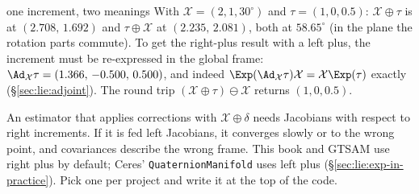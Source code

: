 \begin{example}{one increment, two meanings}
With $\mathcal X=(2,1,30^\circ)$ and $\tau=(1,0,0.5)$: $\mathcal X\oplus\tau$ is at $(2.708,\,1.692)$ and $\tau\oplus\mathcal X$ at $(2.235,\,2.081)$, both at $58.65^\circ$ (in the plane the rotation parts commute). To get the right-plus result with a left plus, the increment must be re-expressed in the global frame: $\Ad_{\mathcal X}\tau=(1.366,\,-0.500,\,0.500)$, and indeed $\Exp(\Ad_{\mathcal X}\tau)\mathcal X=\mathcal X\Exp(\tau)$ exactly (\S\ref{sec:lie:adjoint}). The round trip $(\mathcal X\oplus\tau)\ominus\mathcal X$ returns $(1,0,0.5)$.
\end{example}

\begin{pitfall}
An estimator that applies corrections with $\mathcal X\oplus\delta$ needs Jacobians with respect to right increments. If it is fed left Jacobians, it converges slowly or to the wrong point, and covariances describe the wrong frame. This book and GTSAM use right plus by default; Ceres' \texttt{QuaternionManifold} uses left plus (\S\ref{sec:lie:exp-in-practice}). Pick one per project and write it at the top of the code.
\end{pitfall}
